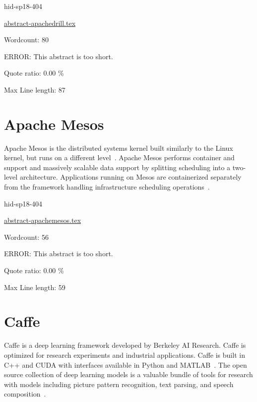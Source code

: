 \begin{IU}

hid-sp18-404

\href{https://github.com/cloudmesh-community/hid-sp18-404/blob/master//technology/abstract-apachedrill.tex}{abstract-apachedrill.tex}

 

Wordcount: 80

ERROR: This abstract is too short.


Quote ratio: 0.00 \%
 
Max Line length: 87
\end{IU}

\section{Apache Mesos}

Apache Mesos is the distributed systems kernel 
built similarly to the Linux kernel, but runs 
on a different level~\cite{hid-sp18-404-Apache2018}. 
Apache Mesos performs container and support and 
massively scalable data support by splitting 
scheduling into a two-level architecture. 
Applications running on Mesos are containerized separately 
from the framework handling infrastructure scheduling 
operations~\cite{hid-sp18-404-Mesos2018}.  

\begin{IU}

hid-sp18-404

\href{https://github.com/cloudmesh-community/hid-sp18-404/blob/master//technology/abstract-apachemesos.tex}{abstract-apachemesos.tex}

 

Wordcount: 56

ERROR: This abstract is too short.


Quote ratio: 0.00 \%
 
Max Line length: 59
\end{IU}

\section{Caffe}

Caffe is a deep learning framework developed by Berkeley AI Research. 
Caffe is optimized for research experiments and industrial applications. 
Caffe is built in C++ and CUDA with interfaces available in Python and 
MATLAB~\cite{hid-sp18-404-Evan}. The open source collection 
of deep learning models is a valuable bundle of tools for research with 
models including picture pattern recognition, text parsing, and speech 
composition~\cite{hid-sp18-404-jia2014caffe}. 


